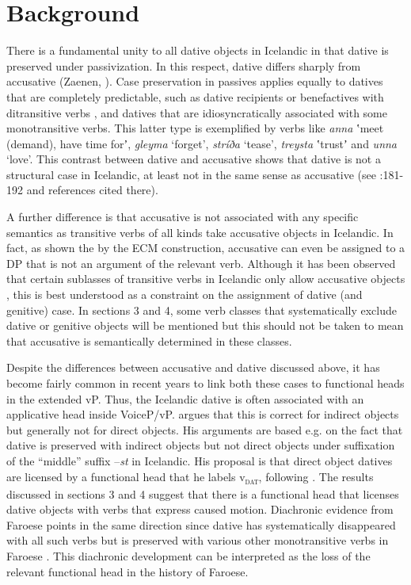 \documentclass[output=paper,modfonts,nonflat]{langsci/langscibook}
\begin{document}
\section{Background} %

There is a fundamental unity to all dative objects in Icelandic in that dative is preserved under passivization. In this respect, dative differs sharply from accusative (Zaenen, \citealt{MalingThráinsson1985}). Case preservation in passives applies equally to datives that are completely predictable, such as dative recipients or benefactives with ditransitive verbs \citep{Jónsson2000}, and datives that are idiosyncratically associated with some monotransitive verbs. This latter type is exemplified by verbs like \textit{anna} ʽmeet (demand), have time forʼ, \textit{gleyma} ‘forget’, \textit{stríða} ‘tease’, \textit{treysta} ʽtrustʼ and \textit{unna} ‘love’. This contrast between dative and accusative shows that dative is not a structural case in Icelandic, at least not in the same sense as accusative (see \citealt{Thráinsson2007}:181-192 and references cited there).

A further difference is that accusative is not associated with any specific semantics as transitive verbs of all kinds take accusative objects in Icelandic. In fact, as shown the by the ECM construction, accusative can even be assigned to a DP that is not an argument of the relevant verb. Although it has been observed that certain sublasses of transitive verbs in Icelandic only allow accusative objects \citep{Jónsson2013a}, this is best understood as a constraint on the assignment of dative (and genitive) case. In sections 3 and 4, some verb classes that systematically exclude dative or genitive objects will be mentioned but this should not be taken to mean that accusative is semantically determined in these classes.

Despite the differences between accusative and dative discussed above, it has become fairly common in recent years to link both these cases to functional heads in the extended vP. Thus, the Icelandic dative is often associated with an applicative head inside VoiceP/vP. \citet[128-138]{Wood2015} argues that this is correct for indirect objects but generally not for direct objects. His arguments are based e.g. on the fact that dative is preserved with indirect objects but not direct objects under suffixation of the “middle” suffix –\textit{st} in Icelandic. His proposal is that direct object datives are licensed by a functional head that he labels v\textsc{\textsubscript{dat}}, following \citet{Svenonius2006}. The results discussed in sections 3 and 4 suggest that there is a functional head that licenses dative objects with verbs that express caused motion. Diachronic evidence from Faroese points in the same direction since dative has systematically disappeared with all such verbs but is preserved with various other monotransitive verbs in Faroese \citep{Jónsson2009}. This diachronic development can be interpreted as the loss of the relevant functional head in the history of Faroese.
\end{document}

